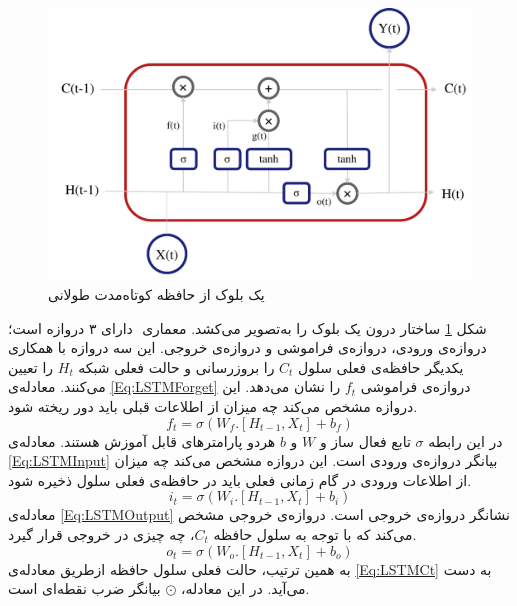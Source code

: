  \begin{figure}[!htb]
	\centering
	\includegraphics[scale=0.6]{Figures/LSTM.pdf}
	\caption{یک بلوک از حافظه کوتاه‌مدت طولانی}
	\label{Fig:LSTMBlock}
\end{figure}
شکل \ref{Fig:LSTMBlock} ساختار درون یک بلوک  را به‌تصویر می‌کشد. معماری ‌ دارای ۳ دروازه است؛ دروازه‌ی ورودی، دروازه‌ی فراموشی و دروازه‌ی خروجی.
این سه دروازه با همکاری یکدیگر حافظه‌ی فعلی سلول $C_{t}$ را بروزرسانی و حالت فعلی شبکه $H_{t}$ را تعیین می‌کنند.  
معادله‌ی \ref{Eq:LSTMForget} دروازه‌ی فراموشی $f_{t}$ را نشان می‌دهد. این دروازه مشخص می‌کند چه میزان از اطلاعات قبلی باید دور ریخته شود.
\begin{equation}
	f_{t} = σ(W_{f}.[H_{t-1},X_{t}] + b_{f})
	\label{Eq:LSTMForget}
\end{equation}
در این رابطه $σ$ تابع فعال ساز و $W$ و $b$ هردو پارامترهای قابل آموزش هستند. معادله‌ی \ref{Eq:LSTMInput} بیانگر دروازه‌ی ورودی است. این دروازه مشخص می‌کند چه میزان از اطلاعات ورودی در گام زمانی فعلی باید در حافظه‌ی فعلی سلول ذخیره شود.
\begin{equation}
	i_{t} = σ(W_{i}.[H_{t-1},X_{t}] + b_{i})
	\label{Eq:LSTMInput}
\end{equation}
معادله‌ی \ref{Eq:LSTMOutput} نشانگر دروازه‌ی خروجی است. دروازه‌ی خروجی مشخص می‌کند که با توجه به سلول حافظه $C_{t}$، چه چیزی در خروجی قرار گیرد.
\begin{equation}
	o_{t} = σ(W_{o}.[H_{t-1},X_{t}] + b_{o})
	\label{Eq:LSTMOutput}
\end{equation}
به همین ترتیب، حالت فعلی سلول حافظه ازطریق معادله‌ی \ref{Eq:LSTMCt} به دست می‌آید. در این معادله، $⊙$ بیانگر ضرب نقطه‌ای است.
